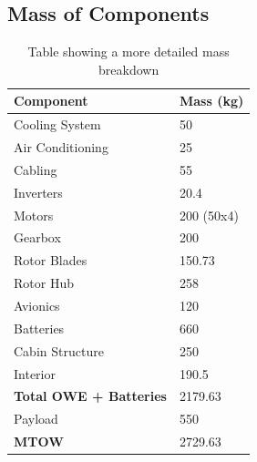 \documentclass[11pt,a4paper]{article}
\begin{document}
\begin{appendices}
\renewcommand\thefigure{A.\arabic{figure}}  
\setcounter{figure}{0}
\renewcommand\theequation{A.\arabic{equation}}  
\setcounter{equation}{0}
\renewcommand\thetable{A.\arabic{table}}  
\setcounter{table}{0}
\thispagestyle{empty}
%
%
\section{Mass of Components}
\begin{table}[H]
\centering
\caption{Table showing a more detailed mass breakdown}
\begin{tabular}{ll}
\hline
\rowcolor[HTML]{DAE8FC} 
Component                      & Mass (kg)                       \\ \hline
Cooling System                 & 50                              \\ \hline
Air Conditioning               & 25                              \\ \hline
Cabling                        & 55                              \\ \hline
Inverters                      & 20.4                            \\ \hline
Motors                         & 200 (50x4)                      \\ \hline
Gearbox                        & 200                             \\ \hline
Rotor Blades                   & 150.73                          \\ \hline
Rotor Hub                      & 258                             \\ \hline
Avionics                       & 120                             \\ \hline
Batteries                      & 660                             \\ \hline
Cabin Structure                & 250                             \\ \hline
Interior                       & 190.5                           \\ \hline
\textbf{Total OWE + Batteries} & \cellcolor[HTML]{FFCCC9}2179.63 \\ \hline
Payload                        & 550                             \\ \hline
\textbf{MTOW}                  & \cellcolor[HTML]{FFCCC9}2729.63 \\ \hline
\end{tabular}
\label{tab:massb}
\end{table}


\end{appendices}
\end{document}
